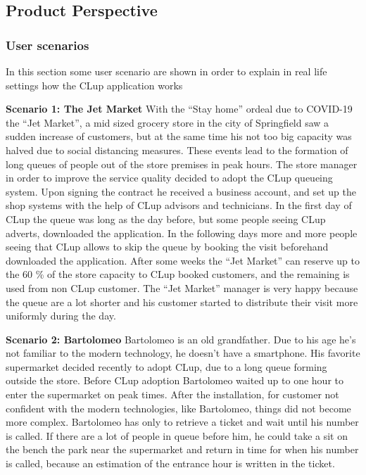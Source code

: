 \subsection{Product Perspective}
\subsubsection{User scenarios}
In this section some user scenario are shown in order to explain in real life settings how the CLup application works

\medskip

\textbf{Scenario 1: The Jet Market}
With the ``Stay home'' ordeal due to COVID-19 the ``Jet Market'', a mid sized grocery store in the city of Springfield saw a sudden increase of customers, but at the same time his not too big capacity was halved due to social distancing measures. These events lead to the formation of long queues of people out of the store premises in peak hours. The store manager in order to improve the service quality decided to adopt the CLup queueing system. Upon signing the contract he received a business account, and set up the shop systems with the help of CLup advisors and technicians. In the first day of CLup the queue was long as the day before, but some people seeing CLup adverts, downloaded the application. In the following days more and more people seeing that CLup allows to skip the queue by booking the visit beforehand downloaded the application. After some weeks the ``Jet Market'' can reserve up to the 60 \% of the store capacity to CLup booked customers, and the remaining is used from non CLup customer. The ``Jet Market'' manager is very happy because the queue are a lot shorter and his customer started to distribute their visit more uniformly during the day.

\medskip

\textbf{Scenario 2: Bartolomeo}
Bartolomeo is an old grandfather. Due to his age he's not familiar to the modern technology, he doesn't have a smartphone. His favorite supermarket decided recently to adopt CLup, due to a long queue forming outside the store. 
Before CLup adoption Bartolomeo waited up to one hour to enter the supermarket on peak times. After the installation, for customer not confident with the modern technologies, like Bartolomeo, things did not become more complex. Bartolomeo has only to retrieve a ticket and wait until his number is called. If there are a lot of people in queue before him, he could take a sit on the bench the park near the supermarket and return in time for when his number is called, because an estimation of the entrance hour is written in the ticket.

